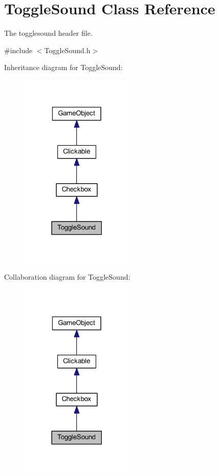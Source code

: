 \hypertarget{class_toggle_sound}{\section{Toggle\+Sound Class Reference}
\label{class_toggle_sound}
}


The togglesound header file.  




{\ttfamily \#include $<$Toggle\+Sound.\+h$>$}



Inheritance diagram for Toggle\+Sound\+:\nopagebreak
\begin{figure}[H]
\begin{center}
\leavevmode
\includegraphics[width=153pt]{class_toggle_sound__inherit__graph}
\end{center}
\end{figure}


Collaboration diagram for Toggle\+Sound\+:\nopagebreak
\begin{figure}[H]
\begin{center}
\leavevmode
\includegraphics[width=153pt]{class_toggle_sound__coll__graph}
\end{center}
\end{figure}
